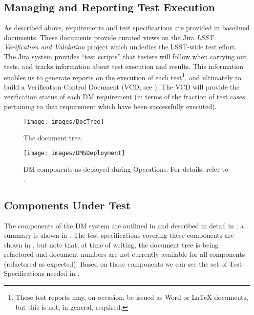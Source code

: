 \subsection{Managing and Reporting Test Execution}
\label{sect:reports}

As described above, requirements and test specifications are provided in baselined documents.
These documents provide curated views on the Jira \emph{LSST Verification and Validation} project which underlies the LSST-wide test effort.
The Jira system provides ``test scripts'' that testers will follow when carrying out tests, and tracks information about test execution and results.
This information enables us to generate reports on the execution of each test\footnote{These test reports may, on occasion, be issued as Word or \LaTeX{} documents, but this is not, in general, required.}, and ultimately to build a Verification Control Document (VCD; see ).
The VCD will provide the verification status of each DM requirement (in terms of the fraction of test cases pertaining to that requirement which have been successfully executed).

\begin{figure}
\begin{center}
 \texttt{[image: images/DocTree]}

 \caption{The \product{} document tree.}
 \label{fig:doctree}

\end{center}
\end{figure}

\begin{figure}[htbp]
	\begin{center}
		\texttt{[image: images/DMSDeployment]}
		\caption{DM components as deployed during Operations. For details, refer to .
		\label{fig:dmsdeploy}}
	\end{center}
\end{figure}

\subsection{Components Under Test}\label{sect:components}

The components of the DM system are outlined in  and described in detail in ; a summary is shown in .
The test specifications covering these components are shown in , but note that, at time of writing, the document tree is being refactored and document numbers are not currently available for all components (refactored as expected).
Based on those components we can see the set of Test Specifications needed in .

